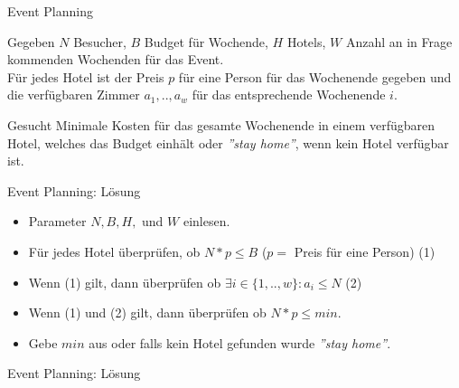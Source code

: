 \begin{frame}{Event Planning}

\begin{block}{Gegeben}
$N$ Besucher, $B$ Budget für Wochende, $H$ Hotels, $W$ Anzahl an in Frage kommenden Wochenden für das Event.\\
Für jedes Hotel ist der Preis $p$ für eine Person für das Wochenende gegeben und die verfügbaren Zimmer $a_1, .., a_w$ für das entsprechende Wochenende $i$.
\end{block}
\begin{block}{Gesucht}
Minimale Kosten für das gesamte Wochenende in einem verfügbaren Hotel, welches das Budget einhält oder \emph{''stay home''}, wenn kein Hotel verfügbar ist.
\end{block}

\end{frame}

\begin{frame}[fragile]{Event Planning: Lösung}

\begin{itemize}
\item Parameter $N, B, H, $ und $W$ einlesen.
\item Für jedes Hotel überprüfen, ob $N*p \le B$ ($p = $ Preis für eine Person) (1)
\item Wenn (1) gilt, dann überprüfen ob $\exists i \in \{1,..,w\}: a_i \le N$ (2)
\item Wenn (1) und (2) gilt, dann überprüfen ob $N*p \le min$.
\item Gebe $min$ aus oder falls kein Hotel gefunden wurde \emph{''stay home''}.
\end{itemize}

\end{frame}

\begin{frame}[fragile]{Event Planning: Lösung}

 

\end{frame}
